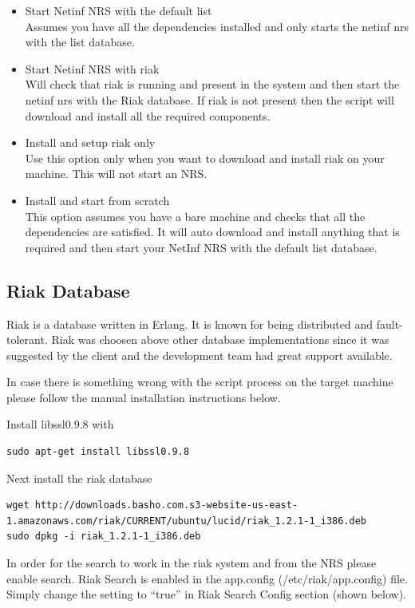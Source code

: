 \begin{itemize}
\item Start Netinf NRS with the default list\\
Assumes you have all the dependencies installed and only starts the netinf nrs with the list database.
\item Start Netinf NRS with riak\\
Will check that riak is running and present in the system and then start the netinf nrs with the Riak database.
If riak is not present then the script will download and install all the required components. 
\item Install and setup riak only\\
Use this option only when you want to download and install riak on your machine. This will not start an NRS.
\item Install and start from scratch\\
This option assumes you have a bare machine and checks that all the dependencies are satisfied. It will auto download and install anything that is required and then start your NetInf NRS with the default list database. 
\end{itemize}


\subsection{Riak Database}

Riak is a database written in Erlang. It is known for being distributed and fault-tolerant. Riak was choosen above other database implementations since it was suggested by the client and the development team had great support available. 

In case there is something wrong with the script process on the target machine please follow the manual installation instructions below.

Install libssl0.9.8 with
\begin {verbatim}
sudo apt-get install libssl0.9.8
\end{verbatim}

Next install the riak database
\begin{verbatim}
wget http://downloads.basho.com.s3-website-us-east-1.amazonaws.com/riak/CURRENT/ubuntu/lucid/riak_1.2.1-1_i386.deb
sudo dpkg -i riak_1.2.1-1_i386.deb
\end{verbatim}

In order for the search to work in the riak system and from the NRS please enable search.
Riak Search is enabled in the app.config (/etc/riak/app.config) file. Simply change the setting to “true” in Riak Search Config section (shown below).


